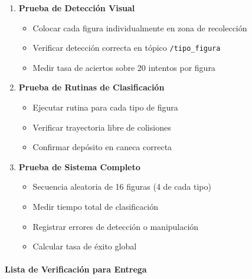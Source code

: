 \begin{enumerate}
    \item \textbf{Prueba de Detección Visual}
    \begin{itemize}
        \item Colocar cada figura individualmente en zona de recolección
        \item Verificar detección correcta en tópico \texttt{/tipo\_figura}
        \item Medir tasa de aciertos sobre 20 intentos por figura
    \end{itemize}
    
    \item \textbf{Prueba de Rutinas de Clasificación}
    \begin{itemize}
        \item Ejecutar rutina para cada tipo de figura
        \item Verificar trayectoria libre de colisiones
        \item Confirmar depósito en caneca correcta
    \end{itemize}
    
    \item \textbf{Prueba de Sistema Completo}
    \begin{itemize}
        \item Secuencia aleatoria de 16 figuras (4 de cada tipo)
        \item Medir tiempo total de clasificación
        \item Registrar errores de detección o manipulación
        \item Calcular tasa de éxito global
    \end{itemize}
\end{enumerate}

\paragraph{Lista de Verificación para Entrega}

